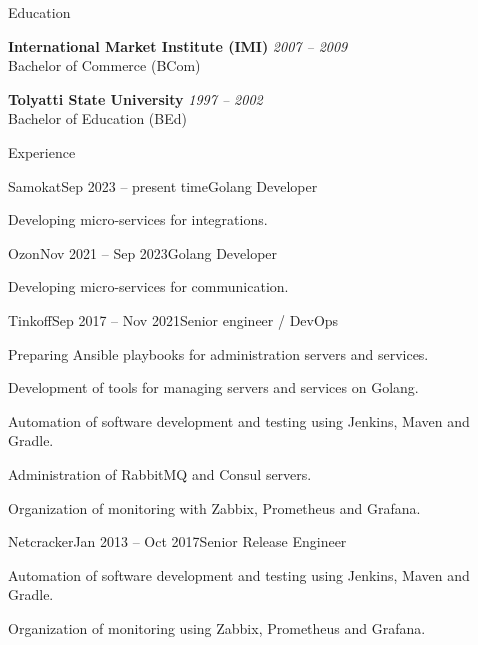 \documentclass{resume} %
\begin{document}

\begin{rSection}{Education}

{\bf International Market Institute (IMI)} \hfill {{\em 2007 -- 2009\/} \\
Bachelor of Commerce (BCom)
}

{\bf Tolyatti State University} \hfill {{\em 1997 -- 2002\/} \\
Bachelor of Education (BEd)
}

\end{rSection}


\begin{rSection}{Experience}

\begin{rSubsection}{Samokat}{Sep 2023 -- present time}{Golang Developer}{}
    \item Developing micro-services for integrations.
\end{rSubsection}

\begin{rSubsection}{Ozon}{Nov 2021 -- Sep 2023}{Golang Developer}{}
    \item Developing micro-services for communication.
\end{rSubsection}

\begin{rSubsection}{Tinkoff}{Sep 2017 -- Nov 2021}{Senior engineer / DevOps}{}
    \item Preparing Ansible playbooks for administration servers and services.
    \item Development of tools for managing servers and services on Golang.
    \item Automation of software development and testing using Jenkins, Maven and Gradle.
    \item Administration of RabbitMQ and Consul servers.
    \item Organization of monitoring with Zabbix, Prometheus and Grafana.
\end{rSubsection}

\begin{rSubsection}{Netcracker}{Jan 2013 -- Oct 2017}{Senior Release Engineer}{}
    \item Automation of software development and testing using Jenkins, Maven and Gradle.
    \item Organization of monitoring using Zabbix, Prometheus and Grafana.
\end{rSubsection}


\end{rSection}
\end{document}
